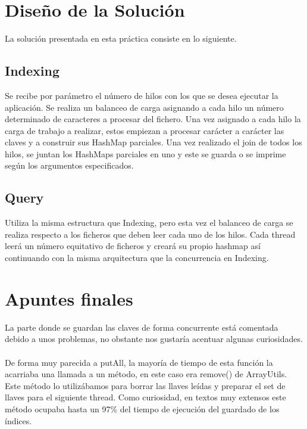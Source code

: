 \documentclass{article}
\begin{document}
\section{Diseño de la Solución}
La solución presentada en esta práctica consiste en lo siguiente.
\subsection{Indexing}
Se recibe por parámetro el número de hilos con los que se desea ejecutar la
aplicación. Se realiza un balanceo de carga asignando a cada hilo un
número determinado de caracteres a procesar del fichero. Una vez asignado a cada
hilo la carga de trabajo a realizar, estos empiezan a procesar carácter a carácter
las claves y a construir sus HashMap parciales. Una vez realizado el join de todos
los hilos, se juntan los HashMaps parciales en uno y este se guarda o se imprime según
los argumentos especificados.
\subsection{Query}
Utiliza la misma estructura que Indexing, pero esta vez el balanceo de carga se
realiza respecto a los ficheros que deben leer cada uno de los hilos. Cada thread
leerá un número equitativo de ficheros y creará su propio hashmap así continuando
con la misma arquitectura que la concurrencia en Indexing.

\section{Apuntes finales}
La parte donde se guardan las claves de forma concurrente está comentada debido
a unos problemas, no obstante nos gustaría acentuar algunas curiosidades.
\\\\
De forma muy parecida a putAll, la mayoría de tiempo de esta función la acarriaba una 
llamada a un método, en este caso era remove() de ArrayUtils. Este método lo
utilizábamos para borrar las llaves leídas y preparar el set de llaves para
el siguiente thread. Como curiosidad, en textos muy extensos este método ocupaba
hasta un 97\% del tiempo de ejecución del guardado de los índices.
\end{document}
